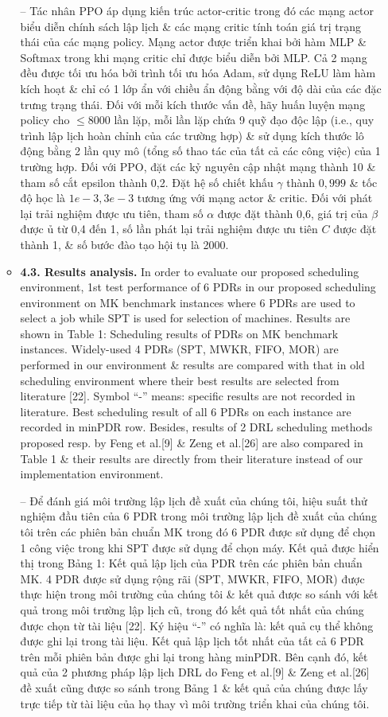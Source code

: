 \documentclass{article}
\begin{document}
\begin{itemize}
\begin{itemize}
        -- Tác nhân PPO áp dụng kiến trúc actor-critic trong đó các mạng actor biểu diễn chính sách lập lịch \& các mạng critic tính toán giá trị trạng thái của các mạng policy. Mạng actor được triển khai bởi hàm MLP \& Softmax trong khi mạng critic chỉ được biểu diễn bởi MLP. Cả 2 mạng đều được tối ưu hóa bởi trình tối ưu hóa Adam, sử dụng ReLU làm hàm kích hoạt \& chỉ có 1 lớp ẩn với chiều ẩn động bằng với độ dài của các đặc trưng trạng thái. Đối với mỗi kích thước vấn đề, hãy huấn luyện mạng policy cho $\le8000$ lần lặp, mỗi lần lặp chứa 9 quỹ đạo độc lập (i.e., quy trình lập lịch hoàn chỉnh của các trường hợp) \& sử dụng kích thước lô động bằng 2 lần quy mô (tổng số thao tác của tất cả các công việc) của 1 trường hợp. Đối với PPO, đặt các kỷ nguyên cập nhật mạng thành 10 \& tham số cắt epsilon thành 0,2. Đặt hệ số chiết khấu $\gamma$ thành $0,999$ \& tốc độ học là $1e-3,3e-3$ tương ứng với mạng actor \& critic. Đối với phát lại trải nghiệm được ưu tiên, tham số $\alpha$ được đặt thành 0,6, giá trị của $\beta$ được ủ từ 0,4 đến 1, số lần phát lại trải nghiệm được ưu tiên $C$ được đặt thành 1, \& số bước đào tạo hội tụ là 2000.
        \item {\bf4.3. Results analysis.} In order to evaluate our proposed scheduling environment, 1st test performance of 6 PDRs in our proposed scheduling environment on MK benchmark instances where 6 PDRs are used to select a job while SPT is used for selection of machines. Results are shown in {\sf Table 1: Scheduling results of PDRs on MK benchmark instances}. Widely-used 4 PDRs (SPT, MWKR, FIFO, MOR) are performed in our environment \& results are compared with that in old scheduling environment where their best results are selected from literature [22]. Symbol ``-'' means: specific results are not recorded in literature. Best scheduling result of all 6 PDRs on each instance are recorded in minPDR row. Besides, results of 2 DRL scheduling methods proposed resp. by Feng et al.[9] \& Zeng et al.[26] are also compared in Table 1 \& their results are directly from their literature instead of our implementation environment.

        -- Để đánh giá môi trường lập lịch đề xuất của chúng tôi, hiệu suất thử nghiệm đầu tiên của 6 PDR trong môi trường lập lịch đề xuất của chúng tôi trên các phiên bản chuẩn MK trong đó 6 PDR được sử dụng để chọn 1 công việc trong khi SPT được sử dụng để chọn máy. Kết quả được hiển thị trong {\sf Bảng 1: Kết quả lập lịch của PDR trên các phiên bản chuẩn MK}. 4 PDR được sử dụng rộng rãi (SPT, MWKR, FIFO, MOR) được thực hiện trong môi trường của chúng tôi \& kết quả được so sánh với kết quả trong môi trường lập lịch cũ, trong đó kết quả tốt nhất của chúng được chọn từ tài liệu [22]. Ký hiệu ``-'' có nghĩa là: kết quả cụ thể không được ghi lại trong tài liệu. Kết quả lập lịch tốt nhất của tất cả 6 PDR trên mỗi phiên bản được ghi lại trong hàng minPDR. Bên cạnh đó, kết quả của 2 phương pháp lập lịch DRL do Feng et al.[9] \& Zeng et al.[26] đề xuất cũng được so sánh trong Bảng 1 \& kết quả của chúng được lấy trực tiếp từ tài liệu của họ thay vì môi trường triển khai của chúng tôi.


\end{itemize}
\end{itemize}
\end{document}
